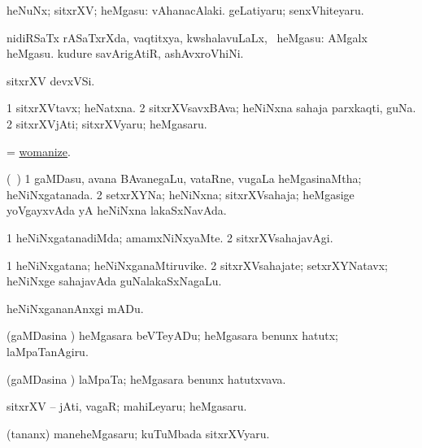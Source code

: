 \bentry
{} 
\gl{\gu}
\expl{}
\bmng
heNuNx; sitxrXV; heMgasu:  vAhanacAlaki.  geLatiyaru; senxVhiteyaru. 
\emng
\eentry

\bentry
{} 
\gl{\sapUpa}
\expl{}
\bmng
nidiRSaTx rASaTxrXda, vaqtitxya, kwshalavuLaLx, \mo\ heMgasu:  AMgalx heMgasu.  kudure savArigAtiR, ashAvxroVhiNi. 
\emng
\eentry

\bentry
{} 
\gl{\nA}
\expl{}
\bmng
sitxrXV devxVSi. 
\emng
\eentry

\bentry
{} 
\gl{\nA}
\expl{}
\bmng
\bnum
\num{1} sitxrXVtavx; heNatxna. 
\num{2} sitxrXVsavxBAva; heNiNxna sahaja parxkaqti, guNa. 
\num{2} sitxrXVjAti; sitxrXVyaru; heMgasaru. 
\enum
\emng
\eentry

\bentry
{} 
\gl{\sakirx}
\expl{}
\bmng
= \hyperlink{womanize}{womanize}. 
\emng
\eentry

\bentry
{} 
\gl{\gu}
\expl{}
\bmng
(\sA\ \hiV) 
\bnum
\num{1} gaMDasu, avana BAvanegaLu, vataRne, \mo vugaLa \vi heMgasinaMtha; heNiNxgatanada. 
\num{2} setxrXYNa; heNiNxna; sitxrXVsahaja; heMgasige yoVgayxvAda yA heNiNxna lakaSxNavAda. 
\enum
\emng
\eentry

\bentry
{} 
\gl{\kirxvi}
\expl{}
\bmng
\bnum
\num{1} heNiNxgatanadiMda; amamxNiNxyaMte. 
\num{2} sitxrXVsahajavAgi. 
\enum
\emng
\eentry

\bentry
{} 
\gl{\nA}
\expl{}
\bmng
\bnum
\num{1} heNiNxgatana; heNiNxganaMtiruvike. 
\num{2} sitxrXVsahajate; setxrXYNatavx; heNiNxge sahajavAda guNalakaSxNagaLu. 
\enum
\emng
\eentry

\bentry
{} 
\gl{\sakirx}
\expl{}
\bmng
heNiNxgananAnxgi mADu. 
\emng

\noindent
\gl{\akirx}
\expl{}
\bmng
(gaMDasina \vi) heMgasara beVTeyADu; heMgasara benunx hatutx; laMpaTanAgiru. 
\emng
\eentry

\bentry
{} 
\gl{\nA}
\expl{}
\bmng
(gaMDasina \vi) laMpaTa; heMgasara benunx hatutxvava. 
\emng
\eentry

\bentry
{} 
\gl{\nA}
\expl{}
\bmng
sitxrXV -- jAti, vagaR; mahiLeyaru; heMgasaru. 
\emng

\noindent 
\gl{\pagu}
\expl{}
\bmng
{} (tananx) maneheMgasaru; kuTuMbada sitxrXVyaru. 
\emng
\eentry

